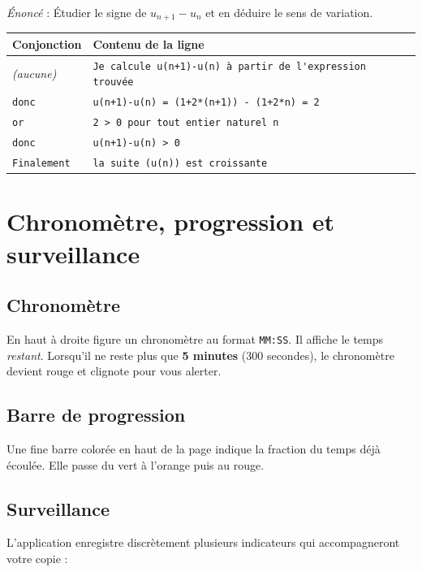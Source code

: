 \documentclass[11pt,a4paper]{article}
\begin{document}
\emph{Énoncé} : \og Étudier le signe de \(u_{n+1}-u_n\) et en déduire le sens de
variation. \fg

\begin{center}
\renewcommand{\arraystretch}{1.25}
\begin{tabular}{@{}p{2.4cm}p{11.5cm}@{}}
\toprule
\textbf{Conjonction} & \textbf{Contenu de la ligne} \\
\midrule
\emph{(aucune)} & \verb|Je calcule u(n+1)-u(n) à partir de l'expression trouvée| \\
\texttt{donc}   & \verb|u(n+1)-u(n) = (1+2*(n+1)) - (1+2*n) = 2| \\
\texttt{or}     & \verb|2 > 0 pour tout entier naturel n| \\
\texttt{donc}   & \verb|u(n+1)-u(n) > 0| \\
\texttt{Finalement} & \verb|la suite (u(n)) est croissante| \\
\bottomrule
\end{tabular}
\end{center}

\section{Chronomètre, progression et surveillance}
\label{sec:surveillance}

\subsection{Chronomètre}

En haut à droite figure un chronomètre au format \texttt{MM:SS}. Il affiche le temps
\emph{restant}. Lorsqu'il ne reste plus que \textbf{5 minutes} (300 secondes), le
chronomètre devient rouge et clignote pour vous alerter.

\subsection{Barre de progression}

Une fine barre colorée en haut de la page indique la fraction du temps déjà écoulée.
Elle passe du vert à l'orange puis au rouge.

\subsection{Surveillance}

L'application enregistre discrètement plusieurs indicateurs qui accompagneront votre
copie :
\end{document}
